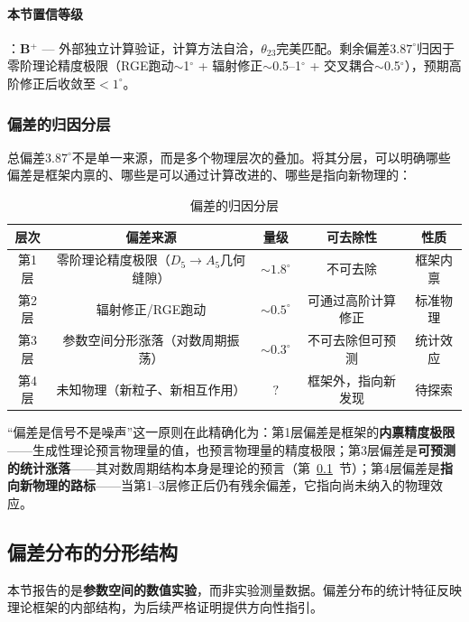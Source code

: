 \paragraph{本节置信等级}：\textbf{B$^+$} --- 外部独立计算验证，计算方法自洽，$\theta_{23}$完美匹配。剩余偏差$3.87^\circ$归因于零阶理论精度极限（RGE跑动$\sim$1$^\circ$ + 辐射修正$\sim$0.5--1$^\circ$ + 交叉耦合$\sim$0.5$^\circ$），预期高阶修正后收敛至$<1^\circ$。

\subsubsection{偏差的归因分层}
\label{subsubsec:deviation_layers}

总偏差$3.87^\circ$不是单一来源，而是多个物理层次的叠加。将其分层，可以明确哪些偏差是框架内禀的、哪些是可以通过计算改进的、哪些是指向新物理的：

\begin{table}[htbp]
\centering
\caption{偏差的归因分层}
\label{tab:deviation_layers}
\begin{tabular}{ccccc}
\hline
层次 & 偏差来源 & 量级 & 可去除性 & 性质 \\
\hline
第1层 & 零阶理论精度极限（$D_5 \to A_5$几何缝隙） & $\sim 1.8^\circ$ & 不可去除 & 框架内禀 \\
第2层 & 辐射修正/RGE跑动 & $\sim 0.5^\circ$ & 可通过高阶计算修正 & 标准物理 \\
第3层 & 参数空间分形涨落（对数周期振荡） & $\sim 0.3^\circ$ & 不可去除但可预测 & 统计效应 \\
第4层 & 未知物理（新粒子、新相互作用） & $?$ & 框架外，指向新发现 & 待探索 \\
\hline
\end{tabular}
\end{table}

``偏差是信号不是噪声''这一原则在此精确化为：第1层偏差是框架的\textbf{内禀精度极限}——生成性理论预言物理量的值，也预言物理量的精度极限；第3层偏差是\textbf{可预测的统计涨落}——其对数周期结构本身是理论的预言（第~\ref{subsec:deviation_fractal}~节）；第4层偏差是\textbf{指向新物理的路标}——当第1--3层修正后仍有残余偏差，它指向尚未纳入的物理效应。

\subsection{偏差分布的分形结构}
\label{subsec:deviation_fractal}

\begin{remark}[本节性质]
本节报告的是\textbf{参数空间的数值实验}，而非实验测量数据。偏差分布的统计特征反映理论框架的内部结构，为后续严格证明提供方向性指引。
\end{remark}

